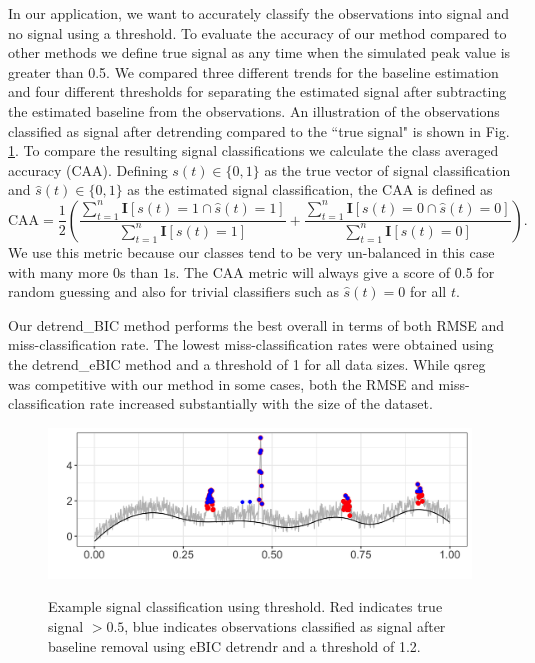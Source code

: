 \documentclass[12pt]{article}
\begin{document}
	In our application, we want to accurately classify the observations into signal and no signal using a threshold. To evaluate the accuracy of our method compared to other methods we define true signal as any time when the simulated peak value is greater than 0.5. We compared three different trends for the baseline estimation and four different thresholds for separating the estimated signal after subtracting the estimated baseline from the observations.  An illustration of the observations classified as signal after detrending compared to the ``true signal" is shown in Fig. \ref{fig:peaks_class_eg}.  To compare the resulting signal classifications we calculate the class averaged accuracy (CAA). Defining $s(t) \in \{0,1\}$ as the true vector of signal classification and $\hat{s}(t) \in \{0,1\}$ as the estimated signal classification, the CAA is defined as
	\begin{equation}
	\mbox{CAA} = \frac{1}{2}\left(\frac{\sum_{t=1}^n \mathbf{I}[s(t) = 1 \cap \hat{s}(t)=1]}{\sum_{t=1}^n \mathbf{I}[s(t) = 1]} + \frac{\sum_{t=1}^n \mathbf{I}[s(t) = 0 \cap \hat{s}(t)=0]}{\sum_{t=1}^n \mathbf{I}[s(t) = 0]}\right).
	\end{equation}  
	We use this metric because our classes tend to be very un-balanced in this case with many more $0$s than $1$s. The CAA metric will always give a score of 0.5 for random guessing and also for trivial classifiers such as $\hat{s}(t) = 0$ for all $t$. 

	Our detrend\_BIC method performs the best overall in terms of both RMSE and miss-classification rate. The lowest miss-classification rates were obtained using the detrend\_eBIC method and a threshold of 1 for all data sizes. While qsreg was competitive with our method in some cases, both the RMSE and miss-classification rate increased substantially with the size of the dataset. 
	
	\begin{figure}[h!]
		\caption{Example signal classification using threshold. Red indicates true signal $>0.5$, blue indicates observations classified as signal after baseline removal using eBIC detrendr and a threshold of 1.2.}
		\includegraphics[width = \linewidth]{Figures/peaks_eg_class.png}
		\label{fig:peaks_class_eg}
	\end{figure}
	
\end{document}
